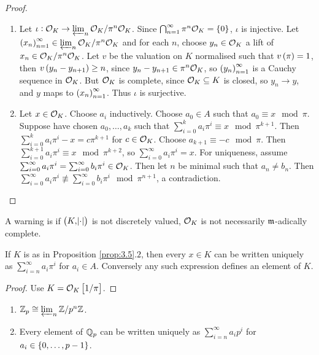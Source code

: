 \begin{proof}
\hfill
\begin{enumerate}
\item Let $ \iota : \mathcal{O}_K \to \varprojlim_n \mathcal{O}_K / \pi^n\mathcal{O}_K $. Since $ \bigcap_{n = 1}^\infty \pi^n\OOO_K = \cbr{0} $, $ \iota $ is injective. Let $ \br{x_n}_{n = 1}^\infty \in \varprojlim_n \OOO_K / \pi^n\OOO_K $ and for each $ n $, choose $ y_n \in \mathcal{O}_K $ a lift of $ x_n \in \mathcal{O}_K / \pi^n\mathcal{O}_K $. Let $ v $ be the valuation on $ K $ normalised such that $ v\br{\pi} = 1 $, then $ v\br{y_n - y_{n + 1}} \ge n $, since $ y_n - y_{n + 1} \in \pi^n\mathcal{O}_K $, so $ \br{y_n}_{n = 1}^\infty $ is a Cauchy sequence in $ \mathcal{O}_K $. But $ \mathcal{O}_K $ is complete, since $ \mathcal{O}_K \subseteq K $ is closed, so $ y_n \to y $, and $ y $ maps to $ \br{x_n}_{n = 1}^\infty $. Thus $ \iota $ is surjective.
\item Let $ x \in \mathcal{O}_K $. Choose $ a_i $ inductively. Choose $ a_0 \in A $ such that $ a_0 \equiv x \mod \pi $. Suppose have chosen $ a_0, \dots, a_k $ such that $ \sum_{i = 0}^k a_i\pi^i \equiv x \mod \pi^{k + 1} $. Then $ \sum_{i = 0}^k a_i\pi^i - x = c\pi^{k + 1} $ for $ c \in \mathcal{O}_K $. Choose $ a_{k + 1} \equiv -c \mod \pi $. Then $ \sum_{i = 0}^{k + 1} a_i\pi^i \equiv x \mod \pi^{k + 2} $, so $ \sum_{i = 0}^\infty a_i\pi^i = x $. For uniqueness, assume $ \sum_{i = 0}^\infty a_i\pi^i = \sum_{i = 0}^\infty b_i\pi^i \in \mathcal{O}_K $. Then let $ n $ be minimal such that $ a_n \ne b_n $. Then $ \sum_{i = 0}^\infty a_i\pi^i \not\equiv \sum_{i = 0}^\infty b_i\pi^i \mod \pi^{n + 1} $, a contradiction.
\end{enumerate}
\end{proof}

A warning is if $ \br{K, \abs{\cdot}} $ is not discretely valued, $ \mathcal{O}_K $ is not necessarily $ \mathfrak{m} $-adically complete.

\begin{corollary}
\label{cor:3.6}
If $ K $ is as in Proposition \ref{prop:3.5}.$ 2 $, then every $ x \in K $ can be written uniquely as $ \sum_{i = n}^\infty a_i\pi^i $ for $ a_i \in A $. Conversely any such expression defines an element of $ K $.
\end{corollary}

\begin{proof}
Use $ K = \OOO_K\sbr{1 / \pi} $.
\end{proof}

\begin{corollary}
\hfill
\begin{enumerate}
\item $ \mathbb{Z}_p \cong \varprojlim_n \mathbb{Z} / p^n\mathbb{Z} $.
\item Every element of $ \mathbb{Q}_p $ can be written uniquely as $ \sum_{i = n}^\infty a_ip^i $ for $ a_i \in \cbr{0, \dots, p - 1} $.
\end{enumerate}
\end{corollary}

